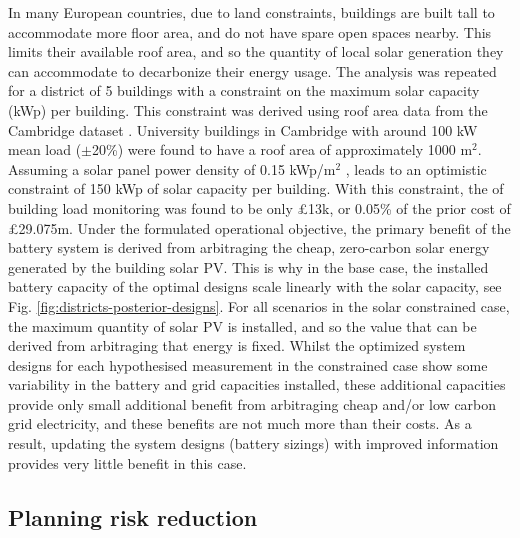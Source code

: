 In many European countries, due to land constraints, buildings are built tall to accommodate more floor area, and do not have spare open spaces nearby. This limits their available roof area, and so the quantity of local solar generation they can accommodate to decarbonize their energy usage. The  analysis was repeated for a district of 5 buildings with a constraint on the maximum solar capacity (kWp) per building. This constraint was derived using roof area data from the Cambridge dataset \citep{langtry2024CambridgeUniversityEstates}. University buildings in Cambridge with around 100 kW mean load ($\pm$20\%) were found to have a roof area of approximately 1000 m$^2$. Assuming a solar panel power density of 0.15 kWp/m$^2$ \citep{gawley2022InvestigatingSuitabilityGIS,gagnon2018EstimatingRooftopSolar}, leads to an optimistic constraint of 150 kWp of solar capacity per building. With this constraint, the  of building load monitoring was found to be only £13k, or 0.05\% of the prior cost of £29.075m. Under the formulated operational objective, the primary benefit of the battery system is derived from arbitraging the cheap, zero-carbon solar energy generated by the building solar PV. This is why in the base case, the installed battery capacity of the optimal designs scale linearly with the solar capacity, see Fig. \ref{fig:districts-posterior-designs}. For all scenarios in the solar constrained case, the maximum quantity of solar PV is installed, and so the value that can be derived from arbitraging that energy is fixed. Whilst the optimized system designs for each hypothesised measurement in the constrained case show some variability in the battery and grid capacities installed, these additional capacities provide only small additional benefit from arbitraging cheap and/or low carbon grid electricity, and these benefits are not much more than their costs. As a result, updating the system designs (battery sizings) with improved information provides very little benefit in this case.\\


\subsection{Planning risk reduction}


